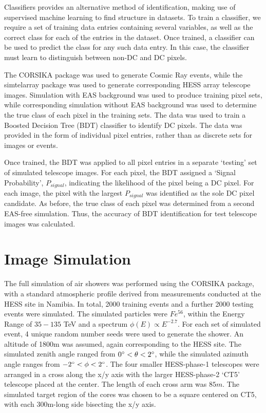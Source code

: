 \documentclass[]{article}
\begin{document}
Classifiers provides an alternative method of identification, making use of supervised machine learning to find structure in datasets. To train a classifier, we require a set of training data entries containing several variables, as well as the correct class for each of the entries in the dataset. Once trained, a classifier can be used to predict the class for any such data entry. In this case, the classifier must learn to distinguish between non-DC and DC pixels. 

The CORSIKA package \cite{Heck98} was used to generate Cosmic Ray events, while the sim\textunderscore telarray package  \cite{Bernlohr08} was used to generate corresponding HESS array telescope images.  Simulation with EAS background was used to produce training pixel sets, while corresponding simulation without EAS background was used to determine the true class of each pixel in the training sets. The data was used to train a Boosted Decision Tree (BDT) classifier to identify DC pixels. The data was provided in the form of individual pixel entries, rather than as discrete sets for images or events.

Once trained, the BDT was applied to all pixel entries in a separate \textquoteleft testing' set of simulated telescope images. For each pixel, the BDT assigned a \textquoteleft Signal Probability', $P_{signal}$, indicating the likelihood of the pixel being a DC pixel. For each image, the pixel with the largest $P_{signal}$ was identified as the sole DC pixel candidate. As before, the true class of each pixel was determined from a second EAS-free simulation. Thus, the accuracy of BDT identification for test telescope images was calculated.

\section{Image Simulation}
The full simulation of air showers was performed using the CORSIKA package, with a standard atmospheric profile derived from measurements conducted at the HESS site in Namibia. In total, 2000 training events and a further 2000 testing events were simulated. The simulated particles were $Fe^{56}$, within the Energy Range of $35-135$ TeV and a spectrum $\phi(E) \propto E^{-2.7}$. For each set of simulated event, 4 unique random number seeds were used to generate the shower. An altitude of 1800m was assumed, again corresponding to the HESS site. The simulated zenith angle ranged from $0\degree < \theta < 2 \degree$, while the simulated azimuth angle ranges from $-2\degree < \phi < 2 \degree$. The four smaller HESS-phase-1 telescopes were arranged in a cross along the x/y axis with the larger HESS-phase-2 \textquoteleft CT5' telescope placed at the center. The length of each cross arm was $85m$. The simulated target region of the cores was chosen to be a square centered on CT5, with each 300m-long side bisecting the x/y axis.
\end{document}
